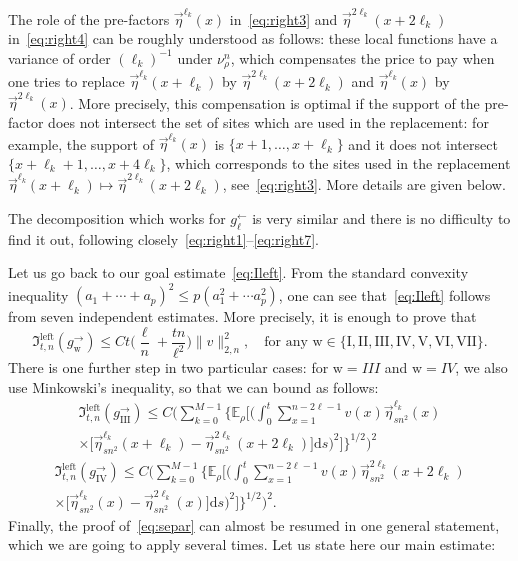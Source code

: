 \documentclass[AHL,Unicode,longabstracts]{cedram}
\newcommand*{\rmw}{\mathrm{w}}
\newcommand*{\rmI}{\mathrm{I}}
\newcommand*{\rmII}{\mathrm{II}}
\newcommand*{\rmIII}{\mathrm{III}}
\newcommand*{\rmIV}{\mathrm{IV}}
\newcommand*{\rmV}{\mathrm{V}}
\newcommand*{\rmVI}{\mathrm{VI}}
\newcommand*{\rmVII}{\mathrm{VII}}
\newcommand{\bb}[1]{{\mathbb #1}}
\newcommand{\mf}[1]{{\mathfrak #1}}
\renewcommand\vec[1]{\overrightarrow{#1}}
\renewcommand{\leq}{\leqslant}
\newcommand*{\dd}{\mathrm{d}}
\newcommand*{\ds}{\dd s}
\begin{document}
The role of the pre-factors $\vec\eta^{\ell_k}(x)$ in~\eqref{eq:right3} and $\vec\eta^{2\ell_k}(x+2\ell_k)$ in~\eqref{eq:right4} can be roughly understood as follows: these local functions have a variance of order $(\ell_k)^{-1}$ under $\nu^n_\rho$, which compensates the price to pay when one tries to replace $\vec\eta^{\ell_k}(x+\ell_k)$ by $\vec\eta^{2\ell_k}(x+2\ell_k)$ and $\vec\eta^{\ell_k}(x)$ by $\vec\eta^{2\ell_k}(x)$. More precisely, this compensation is optimal if the support of the pre-factor does not intersect the set of sites which are used in the replacement: for example, the support of $\vec\eta^{\ell_k}(x)$ is $\{x+1,\dots,x+\ell_k\}$ and it does not intersect $\{x+\ell_k+1,\dots,x+4\ell_k\}$, which corresponds to the sites used in the replacement $\vec\eta^{\ell_k}(x+\ell_k)\mapsto \vec\eta^{2\ell_k}(x+2\ell_k)$, see~\eqref{eq:right3}. More details are given below.

The decomposition which works for $g^\leftarrow_\ell$ is very similar and there is no difficulty to find it out, following closely~\eqref{eq:right1}--\eqref{eq:right7}.

Let us go back to our goal estimate~\eqref{eq:Ileft}. From the standard convexity inequality $(a_1+\cdots+a_p)^2 \leq p(a_1^2+\cdots a_p^2)$, one can see that~\eqref{eq:Ileft} follows from seven independent estimates. More precisely, it is enough to prove that
\begin{equation}\label{eq:separ}
\mf I_{t,n}^{\mathrm{left}}(g^\rightarrow_{\rmw}) \leq Ct\bigg(\frac{\ell}{n}+\frac{tn}{\ell^2}\bigg)\|v\|_{2,n}^2, \quad \text{for any } {\rmw} \in \{\rmI, \rmII, \rmIII, \rmIV, \rmV, \rmVI, \rmVII\}.
\end{equation}
There is one further step in two particular cases: for $\rmw=III$ and $\rmw=IV$, we also use Minkowski's inequality, so that we can bound as follows:
\begin{multline}
\mf I_{t,n}^{\mathrm{left}}(g^\rightarrow_{\rmIII}) \leq C\bigg(\sum_{k=0}^{M-1} \bigg\{\bb E_\rho\bigg[\bigg(\int_0^t \sum_{x=1}^{n-2\ell-1} v(x)\vec\eta_{sn^2}^{\ell_k}(x)\\
\times \Big[\vec\eta_{sn^2}^{\ell_k}(x+\ell_k)-\vec\eta_{sn^2}^{2\ell_k}(x+2\ell_k)\Big]\ds\bigg)^2\bigg] \bigg\}^{1/2} \bigg)^2 \label{eq:right3bis}
\end{multline}
\begin{multline}
\mf I_{t,n}^{\mathrm{left}}(g^\rightarrow_{\rmIV}) \leq C\bigg(\sum_{k=0}^{M-1} \bigg\{\bb E_\rho\bigg[\bigg(\int_0^t \sum_{x=1}^{n-2\ell-1} v(x)\vec\eta_{sn^2}^{2\ell_k}(x+2\ell_k) \\
\times \Big[\vec\eta_{sn^2}^{\ell_k}(x)-\vec\eta_{sn^2}^{2\ell_k}(x)\Big]\ds\bigg)^2\bigg] \bigg\}^{1/2} \bigg)^2.\label{eq:right4bis}
\end{multline}
Finally, the proof of~\eqref{eq:separ} can almost be resumed in one general statement, which we are going to apply several times. Let us state here our main estimate:
\end{document}
